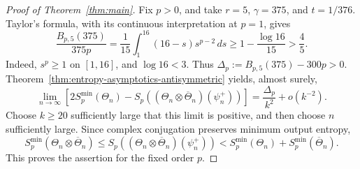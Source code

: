 
\begin{proof}[Proof of Theorem~\ref{thm:main}]
Fix \(p>0\), and take \(r=5\), \(\gamma=375\), and \(t=1/376\).
Taylor's formula, with its continuous interpretation at \(p=1\), gives
\begin{equation}
    \frac{B_{p,5}(375)}{375p}
    =\frac1{15}\int_1^{16}(16-s)s^{p-2}\,ds
    \geq1-\frac{\log16}{15}>\frac45.
\end{equation}
Indeed, \(s^p\geq1\) on \([1,16]\), and \(\log16<3\).
Thus \(\Delta_p:=B_{p,5}(375)-300p>0\).
Theorem~\ref{thm:entropy-asymptotics-antisymmetric} yields, almost surely,
\begin{equation}
    \lim_{n\to\infty}\left[
      2S_p^{\min}(\Theta_n)
      -S_p\!\left((\Theta_n\otimes\overline\Theta_n)(\psi_n^+)\right)
    \right]
    =\frac{\Delta_p}{k^2}+o(k^{-2}).
\end{equation}
Choose \(k\geq20\) sufficiently large that this limit is positive,
and then choose \(n\) sufficiently large. Since complex conjugation
preserves minimum output entropy,
\begin{equation}
    S_p^{\min}(\Theta_n\otimes\overline\Theta_n)
    \leq S_p\!\left((\Theta_n\otimes\overline\Theta_n)(\psi_n^+)\right)
    <S_p^{\min}(\Theta_n)+S_p^{\min}(\overline\Theta_n).
\end{equation}
This proves the assertion for the fixed order \(p\).
\end{proof}
